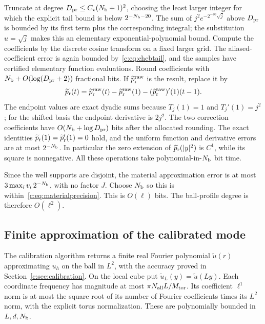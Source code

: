 Truncate at degree $D_{\rm pr}\le C_\star(N_{\rm b}+1)^2$, choosing the least larger
integer for which the explicit tail bound is below $2^{-N_{\rm b}-20}$.
The sum of $j^2e^{-2^{-40}\sqrt j}$ above $D_{\rm pr}$ is bounded by its
first term plus the corresponding integral; the substitution
$u=\sqrt j$ makes this an elementary exponential-polynomial bound.
Compute the coefficients by the discrete cosine transform on a
fixed larger grid. The aliased-coefficient error is again bounded
by~\eqref{c:eq:chebtail}, and the samples have certified elementary
function evaluations. Round coefficients with
$N_{\rm b}+O(\log(D_{\rm pr}+2))$ fractional bits. If $\widetilde p^{\rm raw}_{\rm r}$ is the result,
replace it by
\begin{equation}
 \widetilde p_{\rm r}(t)=\widetilde p^{\rm raw}_{\rm r}(t)-\widetilde p^{\rm raw}_{\rm r}(1)
                     -(\widetilde p^{\rm raw}_{\rm r})'(1)(t-1).     \label{c:eq:endpointmatch}
\end{equation}
The endpoint values are exact dyadic sums because
$T_j(1)=1$ and $T_j'(1)=j^2$; for the shifted basis the
endpoint derivative is $2j^2$. The two correction coefficients have
$O(N_{\rm b}+\log D_{\rm pr})$ bits after the allocated rounding. The exact identities
$\widetilde p_{\rm r}(1)=\widetilde p_{\rm r}'(1)=0$ hold, and the uniform function and derivative
errors are at most $2^{-N_{\rm b}}$. In particular the zero extension of
$\widetilde p_{\rm r}(|y|^2)$ is $C^1$, while its square is nonnegative. All these
operations take polynomial-in-$N_{\rm b}$ bit time.

Since the well supports are disjoint, the material approximation
error is at most $3\max_i v_i\,2^{-N_{\rm b}}$, with no factor $J$.
Choose $N_{\rm b}$ so this is within~\eqref{c:eq:materialprecision}. This is
$O(\ell)$ bits. The ball-profile degree is therefore $O(\ell^2)$.

\subsection{Finite approximation of the calibrated mode}
The calibration algorithm returns a finite real Fourier polynomial
$\widetilde u(r)$ approximating $u_h$ on the ball in $L^2$, with the accuracy
proved in Section~\ref{c:sec:calibration}. On the local cube put
$\widetilde u_L(y)=\widetilde u(Ly)$. Each coordinate frequency has magnitude at most
$\pi N_{\rm all}L/M_{\rm tor}$. Its coefficient $\ell^1$ norm is at most the
square root of its number of Fourier coefficients times its $L^2$
norm, with the explicit torus normalization. These are polynomially
bounded in $L,d,N_{\rm b}$.

